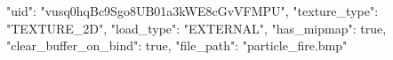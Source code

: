 {
    "uid": "vusq0hqBc9Sgo8UB01a3kWE8cGvVFMPU",
    "texture_type": "TEXTURE_2D",
    "load_type": "EXTERNAL",
    "has_mipmap": true,
    "clear_buffer_on_bind": true,
    "file_path": "particle_fire.bmp"
}